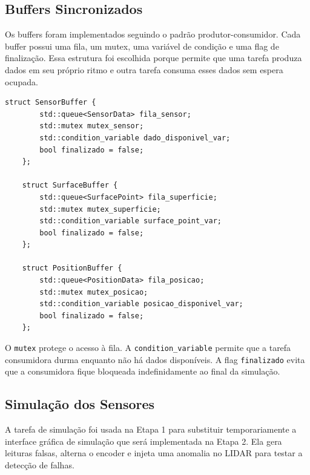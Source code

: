 \documentclass[12pt,a4paper]{article}
\begin{document}
    \subsection{Buffers Sincronizados}

    Os buffers foram implementados seguindo o padrão produtor-consumidor. Cada buffer possui uma fila, um mutex, uma variável de condição e uma flag de finalização. Essa estrutura foi escolhida porque permite que uma tarefa produza dados em seu próprio ritmo e outra tarefa consuma esses dados sem espera ocupada.

    \begin{lstlisting}[style=cppstyle]
    struct SensorBuffer {
        std::queue<SensorData> fila_sensor;
        std::mutex mutex_sensor;
        std::condition_variable dado_disponivel_var;
        bool finalizado = false;
    };

    struct SurfaceBuffer {
        std::queue<SurfacePoint> fila_superficie;
        std::mutex mutex_superficie;
        std::condition_variable surface_point_var;
        bool finalizado = false;
    };

    struct PositionBuffer {
        std::queue<PositionData> fila_posicao;
        std::mutex mutex_posicao;
        std::condition_variable posicao_disponivel_var;
        bool finalizado = false;
    };
    \end{lstlisting}

    O \texttt{mutex} protege o acesso à fila. A \texttt{condition\_variable} permite que a tarefa consumidora durma enquanto não há dados disponíveis. A flag \texttt{finalizado} evita que a consumidora fique bloqueada indefinidamente ao final da simulação.

    \subsection{Simulação dos Sensores}

    A tarefa de simulação foi usada na Etapa 1 para substituir temporariamente a interface gráfica de simulação que será implementada na Etapa 2. Ela gera leituras falsas, alterna o encoder e injeta uma anomalia no LIDAR para testar a detecção de falhas.
\end{document}
